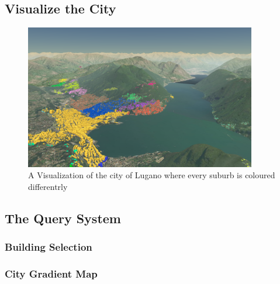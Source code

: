 \subsection{Visualize the City}
\begin{figure} [H]
\centering
\includegraphics[width=0.9\textwidth]{chapter4/images/application_bySuburb}
\caption{A Visualization of the city of Lugano where every suburb is coloured differentrly}
\label{fig:application_bySuburb}
\end{figure}
\subsection{The Query System}
\subsubsection{Building Selection}
\subsubsection{City Gradient Map}